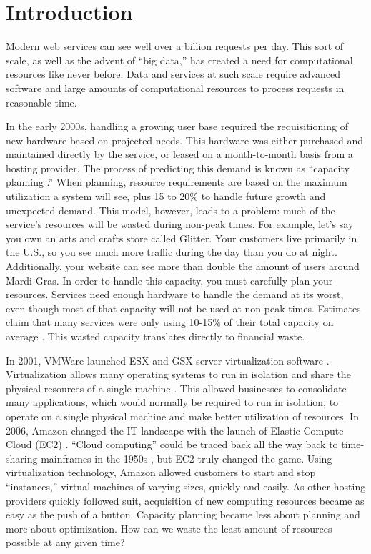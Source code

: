 \chapter{Introduction}
Modern web services can see well over a billion requests per day. This sort of scale, as well as the advent of ``big data,'' has created a need for computational resources like never before. Data and services at such scale require advanced software and large amounts of computational resources to process requests in reasonable time.

In the early 2000s, handling a growing user base required the requisitioning of new hardware based on projected needs. This hardware was either purchased and maintained directly by the service, or leased on a month-to-month basis from a hosting provider. The process of predicting this demand is known as ``capacity planning \cite{allspaw2008art}.'' When planning, resource requirements are based on the maximum utilization a system will see, plus 15 to 20\% to handle future growth and unexpected demand. This model, however, leads to a problem: much of the service's resources will be wasted during non-peak times. For example, let's say you own an arts and crafts store called Glitter. Your customers live primarily in the U.S., so you see much more traffic during the day than you do at night. Additionally, your website can see more than double the amount of users around Mardi Gras. In order to handle this capacity, you must carefully plan your resources. Services need enough hardware to handle the demand at its worst, even though most of that capacity will not be used at non-peak times. Estimates claim that many services were only using 10-15\% of their total capacity on average \cite{vogels2008beyond}. This wasted capacity translates directly to financial waste.

In 2001, VMWare launched ESX and GSX server virtualization software \cite{vmware}. Virtualization allows many operating systems to run in isolation and share the physical resources of a single machine \cite{virtualization}. This allowed businesses to consolidate many applications, which would normally be required to run in isolation, to operate on a single physical machine and make better utilization of resources. In 2006, Amazon changed the IT landscape with the launch of Elastic Compute Cloud (EC2) \cite{ec2}. ``Cloud computing'' could be traced back all the way back to time-sharing mainframes in the 1950s \cite{strachey1959time}, but EC2 truly changed the game. Using virtualization technology, Amazon allowed customers to start and stop ``instances,'' virtual machines of varying sizes, quickly and easily. As other hosting providers quickly followed suit, acquisition of new computing resources became as easy as the push of a button. Capacity planning became less about planning and more about optimization. How can we waste the least amount of resources possible at any given time?

